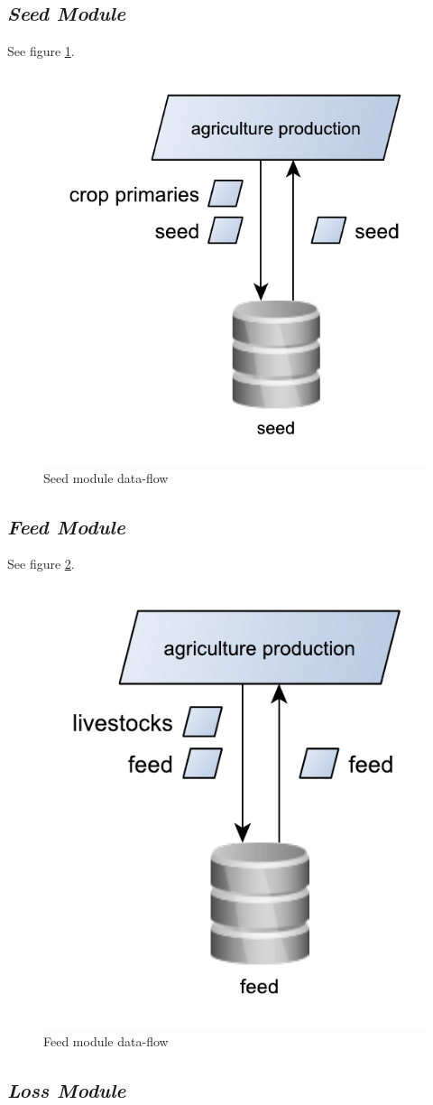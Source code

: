 \documentclass[]{article}
\begin{document}
\subsection{\texorpdfstring{\emph{Seed
Module}}{Seed Module}}\label{seed-module}

See figure \ref{fig:f10}.

\begin{figure}[H]

{\centering \includegraphics[width=0.35\linewidth]{images/SwsFbs/10_seed} 

}

\caption{\label{fig:f10}Seed module data-flow}\label{fig:f10}
\end{figure}

\subsection{\texorpdfstring{\emph{Feed
Module}}{Feed Module}}\label{feed-module}

See figure \ref{fig:f11}.

\begin{figure}[H]

{\centering \includegraphics[width=0.3\linewidth]{images/SwsFbs/11_feed} 

}

\caption{\label{fig:f11}Feed module data-flow}\label{fig:f11}
\end{figure}

\subsection{\texorpdfstring{\emph{Loss
Module}}{Loss Module}}\label{loss-module}
\end{document}
